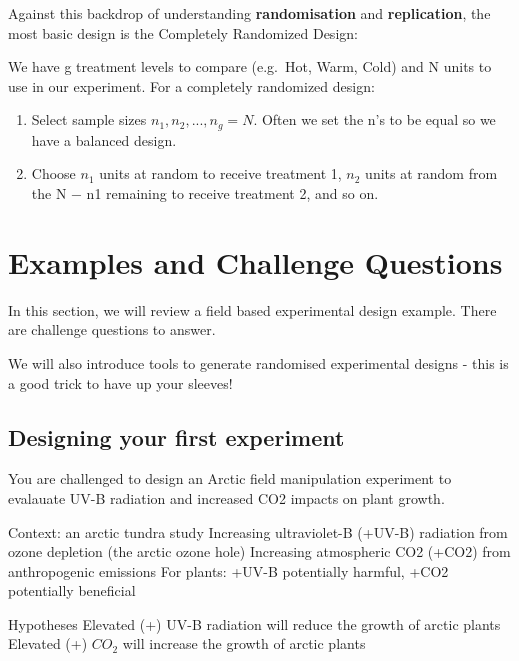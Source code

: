 \documentclass[
]{book}
\providecommand{\tightlist}{%
  \setlength{\itemsep}{0pt}\setlength{\parskip}{0pt}}
\begin{document}
Against this backdrop of understanding \textbf{randomisation} and \textbf{replication}, the most basic design is the Completely Randomized Design:

We have g treatment levels to compare (e.g.~Hot, Warm, Cold) and N units to use in our experiment. For a completely randomized design:

\begin{enumerate}
\def\labelenumi{\arabic{enumi}.}
\tightlist
\item
  Select sample sizes \(n_{1}, n_{2}, . . . , n_{g} = N\). Often we set the n's to be equal so we have a balanced design.
\item
  Choose \(n_{1}\) units at random to receive treatment 1, \(n_{2}\) units at random from the N − n1 remaining to receive treatment 2, and so on.
\end{enumerate}

\hypertarget{examples-and-challenge-questions}{%
\chapter{Examples and Challenge Questions}\label{examples-and-challenge-questions}}

In this section, we will review a field based experimental design example. There are challenge questions to answer.

We will also introduce tools to generate randomised experimental designs - this is a good trick to have up your sleeves!

\hypertarget{designing-your-first-experiment}{%
\section{Designing your first experiment}\label{designing-your-first-experiment}}

You are challenged to design an Arctic field manipulation experiment to evalauate UV-B radiation and increased CO2 impacts on plant growth.

Context: an arctic tundra study
Increasing ultraviolet-B (+UV-B) radiation from ozone depletion (the arctic ozone hole)
Increasing atmospheric CO2 (+CO2) from anthropogenic emissions
For plants: +UV-B potentially harmful, +CO2 potentially beneficial

Hypotheses
Elevated (+) UV-B radiation will reduce the growth of arctic plants
Elevated (+) \(CO_{2}\) will increase the growth of arctic plants
\end{document}
